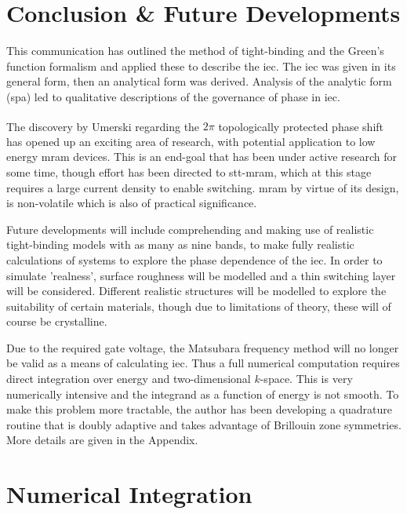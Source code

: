 \documentclass[a4paper, 12pt]{article}
\begin{document}
	\section{Conclusion \& Future Developments}
	\par This communication has outlined the method of tight-binding and the Green's function formalism and applied these to describe the \gls{iec}. The \gls{iec} was given in its general form, then an analytical form was derived. Analysis of the analytic form (\gls{spa}) led to qualitative descriptions of the governance of phase in \gls{iec}. 
	\\\par The discovery by Umerski\textsuperscript{\textcolor{blue}{\cite{AUphase}}} regarding the $2\pi$ topologically protected phase shift has opened up an exciting area of research, with potential application to low energy \gls{mram} devices. This is an end-goal that has been under active research for some time, though effort has been directed to \gls{stt}-\gls{mram}, which at this stage requires a large current density to enable switching. \gls{mram} by virtue of its design, is non-volatile which is also of practical significance.
	\\\par Future developments will include comprehending and making use of realistic tight-binding models with as many as nine bands, to make fully realistic calculations of systems to explore the phase dependence of the \gls{iec}.
In order to simulate 'realness', surface roughness will be modelled and a thin switching layer will be considered.
Different realistic structures will be modelled to explore the suitability of certain materials, though due to limitations of theory, these will of course be crystalline.
\\\par Due to the required gate voltage, the Matsubara frequency method will no longer be valid as a means of calculating \gls{iec}.
Thus a full numerical computation requires direct integration over energy and two-dimensional $k$-space. This is very numerically intensive and the integrand as a function of energy is not smooth.
To make this problem more tractable, the author has been developing a quadrature routine that is doubly adaptive and takes advantage of Brillouin zone symmetries.
More details are given in the Appendix.

	\appendix
	\section{Numerical Integration}
\end{document}
